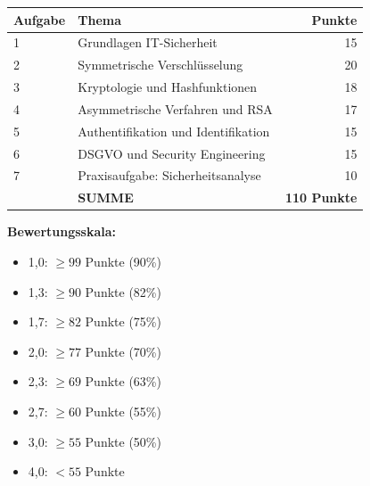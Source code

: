 \documentclass[12pt,a4paper]{article}
\begin{document}
\begin{tabularx}{\textwidth}{|l|X|r|}
    \hline
    \textbf{Aufgabe} & \textbf{Thema} & \textbf{Punkte} \\
    \hline
    1 & Grundlagen IT-Sicherheit & 15 \\
    2 & Symmetrische Verschlüsselung & 20 \\
    3 & Kryptologie und Hashfunktionen & 18 \\
    4 & Asymmetrische Verfahren und RSA & 17 \\
    5 & Authentifikation und Identifikation & 15 \\
    6 & DSGVO und Security Engineering & 15 \\
    7 & Praxisaufgabe: Sicherheitsanalyse & 10 \\
    \hline
    & \textbf{SUMME} & \textbf{110 Punkte} \\
    \hline
\end{tabularx}

\vspace{1cm}

\textbf{Bewertungsskala:}
\begin{itemize}
    \item 1,0: $\geq 99$ Punkte (90\%)
    \item 1,3: $\geq 90$ Punkte (82\%)
    \item 1,7: $\geq 82$ Punkte (75\%)
    \item 2,0: $\geq 77$ Punkte (70\%)
    \item 2,3: $\geq 69$ Punkte (63\%)
    \item 2,7: $\geq 60$ Punkte (55\%)
    \item 3,0: $\geq 55$ Punkte (50\%)
    \item 4,0: $< 55$ Punkte
\end{itemize}
\end{document}
